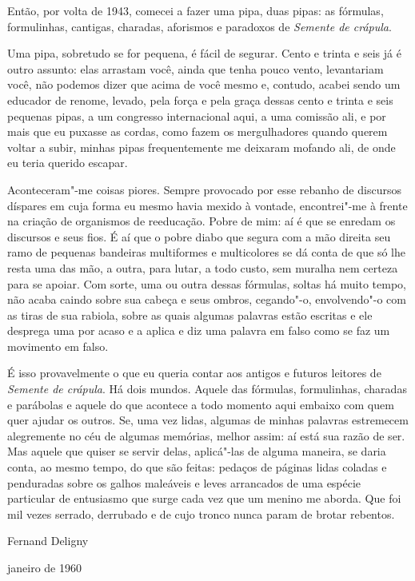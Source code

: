 Então, por volta de 1943, comecei a fazer uma pipa, duas pipas: as
fórmulas, formulinhas, cantigas, charadas, aforismos e paradoxos de
\emph{Semente de crápula}.

Uma pipa, sobretudo se for pequena, é fácil de segurar. Cento e trinta e
seis já é outro assunto: elas arrastam você, ainda que tenha pouco
vento, levantariam você, não podemos dizer que acima de você mesmo e,
contudo, acabei sendo um educador de renome, levado, pela força e pela
graça dessas cento e trinta e seis pequenas pipas, a um congresso
internacional aqui, a uma comissão ali, e por mais que eu puxasse as
cordas, como fazem os mergulhadores quando querem voltar a subir, minhas
pipas frequentemente me deixaram mofando ali, de onde eu teria querido
escapar.

Aconteceram"-me coisas piores. Sempre provocado por esse rebanho de
discursos díspares em cuja forma eu mesmo havia mexido à vontade,
encontrei"-me à frente na criação de organismos de reeducação. Pobre de
mim: aí é que se enredam os discursos e seus fios. É aí que o pobre
diabo que segura com a mão direita seu ramo de pequenas bandeiras
multiformes e multicolores se dá conta de que só lhe resta uma das mão,
a outra, para lutar, a todo custo, sem muralha nem certeza para se
apoiar. Com sorte, uma ou outra dessas fórmulas, soltas há muito tempo,
não acaba caindo sobre sua cabeça e seus ombros, cegando"-o, envolvendo"-o
com as tiras de sua rabiola, sobre as quais algumas palavras estão
escritas e ele desprega uma por acaso e a aplica e diz uma palavra em
falso como se faz um movimento em falso.

É isso provavelmente o que eu queria contar aos antigos e futuros
leitores de \emph{Semente de crápula}. Há dois mundos. Aquele das
fórmulas, formulinhas, charadas e parábolas e aquele do que acontece a
todo momento aqui embaixo com quem quer ajudar os outros. Se, uma vez
lidas, algumas de minhas palavras estremecem alegremente no céu de
algumas memórias, melhor assim: aí está sua razão de ser. Mas aquele que
quiser se servir delas, aplicá"-las de alguma maneira, se daria conta, ao
mesmo tempo, do que são feitas: pedaços de páginas lidas coladas e
penduradas sobre os galhos maleáveis e leves arrancados de uma espécie
particular de entusiasmo que surge cada vez que um menino me aborda. Que
foi mil vezes serrado, derrubado e de cujo tronco nunca param de brotar
rebentos.

\hfill{}Fernand Deligny

\hfill{}janeiro de 1960

